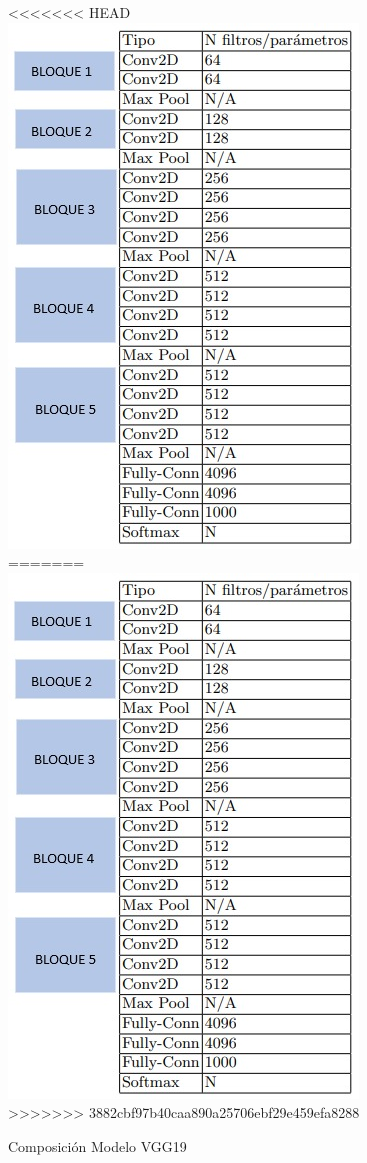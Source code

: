 				\begin{figure}[ht]
					\centering
<<<<<<< HEAD
					\includegraphics[scale=0.5]{Figs/21.jpeg}
=======
					\includegraphics[scale=0.2]{Figs/21.jpeg}
>>>>>>> 3882cbf97b40caa890a25706ebf29e459efa8288
					\caption{Composición Modelo VGG19}
					\label{fig:VGG19_tabla}
				\end{figure}

